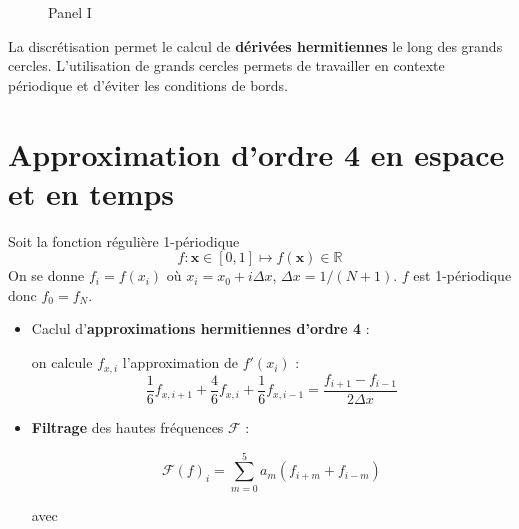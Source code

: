 \documentclass{sciposter}
\def\gsum{\displaystyle\sum\limits}
\begin{document}
\begin{multicols}{3}
\begin{figure}[htbp]
\begin{center}
\end{center}
\caption{Panel I}
\end{figure}

La discrétisation permet le calcul de \textbf{dérivées hermitiennes} le long des grands cercles. L'utilisation de grands cercles permets de travailler en contexte périodique et d'éviter les conditions de bords.

\vspace{1.89cm}

\section*{Approximation d'ordre 4 en espace et en temps}

Soit la fonction régulière 1-périodique
\begin{equation}
f : \mathbf{x} \in [0,1] \mapsto f(\mathbf{x}) \in \mathbb{R}
\end{equation}
On se donne $f_i = f(x_i)$ où $x_i = x_0 + i \Delta x$, $\Delta x=1/(N+1)$. $f$ est 1-périodique donc $f_0 = f_N$.

\begin{itemize}
\item Caclul d'\textbf{approximations hermitiennes d'ordre 4} :

on calcule $f_{x,i}$ l'approximation de $f'(x_i)$ :
\begin{equation}
\dfrac{1}{6} f_{x,i+1} + \dfrac{4}{6} f_{x,i} + \dfrac{1}{6} f_{x,i-1} = \dfrac{f_{i+1} - f_{i-1}}{2 \Delta x}
\end{equation}

\item \textbf{Filtrage} des hautes fréquences $\mathcal{F}$ :

\begin{equation}
\mathcal{F}(f)_i = \gsum_{m=0}^{5} a_m \left( f_{i+m} + f_{i-m} \right)
\end{equation}

avec 


\end{itemize}
\end{multicols}
\end{document}

